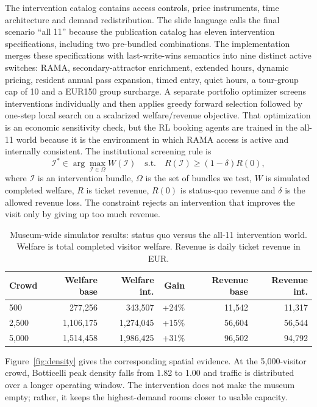 \documentclass[11pt]{article}
\newenvironment{addedblock}{\begingroup\color{green!50!black}}{\endgroup}
\begin{document}
The intervention catalog contains access controls, price instruments, time architecture and demand
redistribution. The slide language calls the final scenario ``all 11'' because the publication catalog
has eleven intervention specifications, including two pre-bundled combinations. The implementation
merges these specifications with last-write-wins semantics into nine distinct active switches: RAMA,
secondary-attractor enrichment, extended hours, dynamic pricing, resident annual pass expansion,
timed entry, quiet hours, a tour-group cap of 10 and a EUR150 group surcharge. A separate portfolio
optimizer screens interventions individually and then applies greedy forward selection followed by
one-step local search on a scalarized welfare/revenue objective. That optimization is an
economic sensitivity check, but the RL booking agents are trained in the all-11 world because it is the
environment in which RAMA access is active and internally consistent.
\begin{addedblock}
The institutional screening rule is
\[
\mathcal I^*\in\arg\max_{\mathcal I\in\Omega} W(\mathcal I)
\quad\text{s.t.}\quad R(\mathcal I)\ge (1-\delta)R(0),
\]
where $\mathcal I$ is an intervention bundle, $\Omega$ is the set of bundles we test, $W$ is simulated
completed welfare, $R$ is ticket revenue, $R(0)$ is status-quo revenue and $\delta$ is the allowed
revenue loss. The constraint rejects an intervention that improves the visit only by giving up too
much revenue.
\end{addedblock}

\begin{table}[t]
\centering
\caption{Museum-wide simulator results: status quo versus the all-11 intervention world. Welfare is
total completed visitor welfare. Revenue is daily ticket revenue in EUR.}
\label{tab:museum-wide}
\begin{tabular}{lrrrrr}
\toprule
Crowd & Welfare base & Welfare int. & Gain & Revenue base & Revenue int. \\
\midrule
500   & 277,256   & 343,507   & +24\% & 11,542 & 11,317 \\
2,500 & 1,106,175 & 1,274,045 & +15\% & 56,604 & 56,544 \\
5,000 & 1,514,458 & 1,986,425 & +31\% & 96,502 & 94,792 \\
\bottomrule
\end{tabular}
\end{table}

Figure~\ref{fig:density} gives the corresponding spatial evidence. At the 5,000-visitor crowd,
Botticelli peak density falls from 1.82 to 1.00 and traffic is distributed over a longer operating
window. The intervention does not make the museum empty; rather, it keeps the highest-demand rooms
closer to usable capacity.
\end{document}
